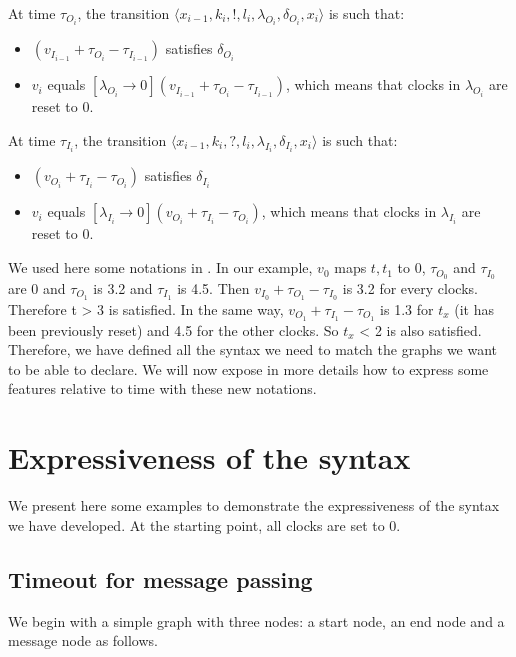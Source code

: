 \documentclass[a4paper,11pt,twoside]{report}
\begin{document}
At time $\tau_{O_{i}}$, the transition $\langle x_{i-1}, k_i, !,l_i, \lambda_{O_i}, \delta_{O_i}, x_i \rangle$ is such that: 
\begin{itemize}
\item $( v_{I_{i-1}} + \tau_{O_i} - \tau_{I_{i-1}} )$ satisfies $\delta_{O_i}$ 
\item $v_i$ equals $[\lambda_{O_i}\rightarrow0]( v_{I_{i-1}} + \tau_{O_i} - \tau_{I_{i-1}} )$, which means that clocks in $\lambda_{O_i}$ are reset to 0. 
\end{itemize}
At time $\tau_{I_{i}}$, the transition $\langle x_{i-1}, k_i, ?,l_i, \lambda_{I_i}, \delta_{I_i}, x_i \rangle$ is such that: 
\begin{itemize}
\item $( v_{O_i} + \tau_{I_i} - \tau_{O_{i}} )$ satisfies $\delta_{I_i}$ 
\item $v_i$ equals $[\lambda_{I_i}\rightarrow0]( v_{O_i} + \tau_{I_i} - \tau_{O_{i}} )$, which means that clocks in $\lambda_{I_i}$ are reset to 0. 
\end{itemize}
 We used here some notations in \cite{alur1994theory}. In our example, $v_0$ maps $t, t_1$ to 0, $\tau_{O_0}$ and $\tau_{I_0}$ are 0 and $\tau_{O_1}$ is 3.2 and $\tau_{I_1}$ is 4.5. Then $v_{I_0} + \tau_{O_1} - \tau_{I_0}$ is 3.2 for every clocks. Therefore t > 3 is satisfied. In the same way, $v_{O_1} + \tau_{I_1} - \tau_{O_1}$ is 1.3 for $t_x$ (it has been previously reset) and 4.5 for the other clocks. So $t_{x}$ < 2 is also satisfied.
~~\\

Therefore, we have defined all the syntax we need to match the graphs we want to be able to declare. We will now expose in more details how to express some features relative to time with these new notations.


\section{Expressiveness of the syntax}
We present here some examples to demonstrate the expressiveness of the syntax we have developed. At the starting point, all clocks are set to 0. 

\subsection{Timeout for message passing}
We begin with a simple graph with three nodes: a start node, an end node and a message node as follows.
\end{document}
